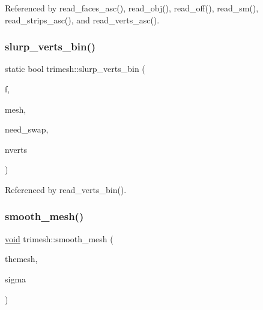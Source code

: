 Referenced by read\+\_\+faces\+\_\+asc(), read\+\_\+obj(), read\+\_\+off(), read\+\_\+sm(), read\+\_\+strips\+\_\+asc(), and read\+\_\+verts\+\_\+asc().

\mbox{\label{namespacetrimesh_aff82fb96a67444ad578b0d83579b4f31}} 
\subsubsection{\texorpdfstring{slurp\+\_\+verts\+\_\+bin()}{slurp\_verts\_bin()}}
{\footnotesize\ttfamily static bool trimesh\+::slurp\+\_\+verts\+\_\+bin (\begin{DoxyParamCaption}\item[{F\+I\+LE $\ast$}]{f,  }\item[{\hyperlink{classtrimesh_1_1TriMesh}{Tri\+Mesh} $\ast$}]{mesh,  }\item[{bool}]{need\+\_\+swap,  }\item[{int}]{nverts }\end{DoxyParamCaption})\hspace{0.3cm}{\ttfamily [static]}}



Referenced by read\+\_\+verts\+\_\+bin().

\mbox{\label{namespacetrimesh_a8b38bcecd65c147dfe9011c2a4d6fdda}} 
\subsubsection{\texorpdfstring{smooth\+\_\+mesh()}{smooth\_mesh()}}
{\footnotesize\ttfamily \hyperlink{namespacetrimesh_a784ddfd979e1c579bda795a8edfc3f43}{void} trimesh\+::smooth\+\_\+mesh (\begin{DoxyParamCaption}\item[{\hyperlink{classtrimesh_1_1TriMesh}{Tri\+Mesh} $\ast$}]{themesh,  }\item[{float}]{sigma }\end{DoxyParamCaption})}

\mbox{\label{namespacetrimesh_abf9461d50c23930206bc063132b88552}} 
